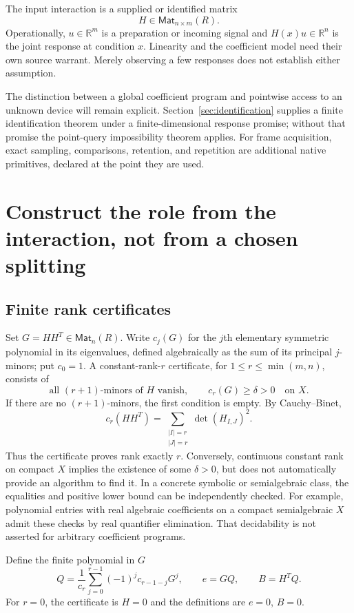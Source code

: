 \documentclass[11pt]{article}
\theoremstyle{definition}
\theoremstyle{remark}
\newcommand{\R}{\mathbb R}
\newcommand{\Mat}{\mathsf{Mat}}
\begin{document}
The input interaction is a supplied or identified matrix
\[
                         H\in\Mat_{n\times m}(R).
\]
Operationally, $u\in\R^m$ is a preparation or incoming signal and $H(x)u\in\R^n$ is the joint response at condition $x$. Linearity and the coefficient model need their own source warrant. Merely observing a few responses does not establish either assumption.


The distinction between a global coefficient program and pointwise access to an unknown device will remain explicit. Section~\ref{sec:identification} supplies a finite identification theorem under a finite-dimensional response promise; without that promise the point-query impossibility theorem applies. For frame acquisition, exact sampling, comparisons, retention, and repetition are additional native primitives, declared at the point they are used.

\section{Construct the role from the interaction, not from a chosen splitting}
\subsection{Finite rank certificates}
Set $G=HH^T\in\Mat_n(R)$. Write $c_j(G)$ for the $j$th elementary symmetric polynomial in its eigenvalues, defined algebraically as the sum of its principal $j$-minors; put $c_0=1$. A constant-rank-$r$ certificate, for $1\le r\le\min(m,n)$, consists of
\begin{equation}\label{m-eq:rank-certificate}
 \text{all $(r+1)$-minors of $H$ vanish},\qquad c_r(G)\ge\delta>0
 \quad\text{on }X.
\end{equation}
If there are no $(r+1)$-minors, the first condition is empty. By Cauchy--Binet,
\[
 c_r(HH^T)=\sum_{\substack{|I|=r\\|J|=r}}\det(H_{I,J})^2.
\]
Thus the certificate proves rank exactly $r$. Conversely, continuous constant rank on compact $X$ implies the existence of some $\delta>0$, but does not automatically provide an algorithm to find it. In a concrete symbolic or semialgebraic class, the equalities and positive lower bound can be independently checked. For example, polynomial entries with real algebraic coefficients on a compact semialgebraic $X$ admit these checks by real quantifier elimination. That decidability is not asserted for arbitrary coefficient programs.

Define the finite polynomial in $G$
\begin{equation}\label{m-eq:Q}
 Q=\frac{1}{c_r}\sum_{j=0}^{r-1}(-1)^j c_{r-1-j}G^j,
 \qquad e=GQ,\qquad B=H^TQ.
\end{equation}
For $r=0$, the certificate is $H=0$ and the definitions are $e=0$, $B=0$.
\end{document}
